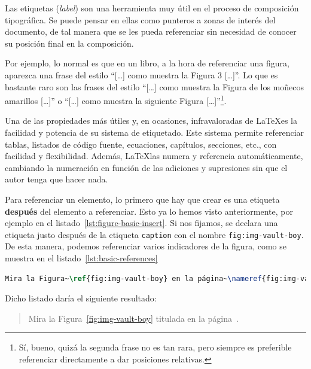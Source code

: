 \documentclass[%
    school=etsisi,%
    degree=61TI,%
]{upm-report}
\begin{document}
Las etiquetas (\textit{label}) son una herramienta muy útil en el proceso de composición tipográfica. Se puede pensar en ellas como punteros a zonas de interés del documento, de tal manera que se les pueda referenciar sin necesidad de conocer su posición final en la composición.

Por ejemplo, lo normal es que en un libro, a la hora de referenciar una figura, aparezca una frase del estilo ``[\ldots] como muestra la Figura 3 [\ldots]''. Lo que es bastante raro son las frases del estilo ``[\ldots] como muestra la Figura de los moñecos amarillos [\ldots]'' o ``[\ldots] como muestra la siguiente Figura [\ldots]''\footnote{Sí, bueno, quizá la segunda frase no es tan rara, pero siempre es preferible referenciar directamente a dar posiciones relativas.}.

Una de las propiedades más útiles y, en ocasiones, infravaloradas de \LaTeX es la facilidad y potencia de su sistema de etiquetado. Este sistema permite referenciar tablas, listados de código fuente, ecuaciones, capítulos, secciones, etc., con facilidad y flexibilidad. Además, \LaTeX las numera y referencia automáticamente, cambiando la numeración en función de las adiciones y supresiones sin que el autor tenga que hacer nada.

Para referenciar un elemento, lo primero que hay que crear es una etiqueta \textbf{después} del elemento a referenciar. Esto ya lo hemos visto anteriormente, por ejemplo en el listado~\ref{lst:figure-basic-insert}. Si nos fijamos, se declara una etiqueta justo después de la etiqueta \texttt{caption} con el nombre \texttt{fig:img-vault-boy}. De esta manera, podemos referenciar varios indicadores de la figura, como se muestra en el listado~\ref{lst:basic-references}

\begin{lstlisting}[language=tex, caption=Referenciando una figura y su página,label={lst:basic-references},]
Mira la Figura~\ref{fig:img-vault-boy} en la página~\nameref{fig:img-vault-boy}.
\end{lstlisting}

Dicho listado daría el siguiente resultado:

\blockquote{Mira la Figura~\ref{fig:img-vault-boy} titulada  en la página~\pageref{fig:img-vault-boy}.}

\end{document}
